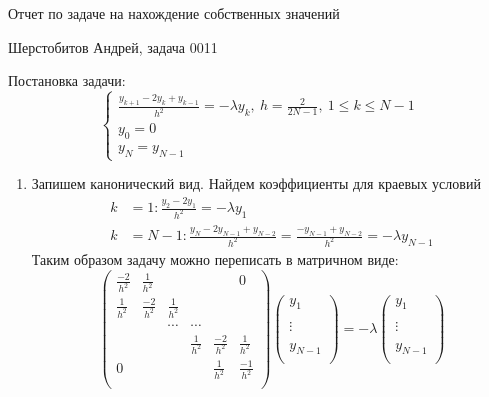 \documentclass[12pt]{article}
\begin{document}
\begin{center}
	Отчет по задаче на нахождение собственных значений
\end{center}
\begin{center}
	Шерстобитов Андрей, задача 0011
\end{center}
Постановка задачи:
\[\begin{cases}
		\frac{y_{k+1}-2y_k+y_{k-1}}{h^2} = -\lambda y_k,\ h = \frac{2}{2N-1},\ 1 \leq k \leq N-1 \\
		y_0 = 0                                                                                  \\
		y_N = y_{N-1}
	\end{cases}\]
\begin{enumerate}
	\item Запишем канонический вид. Найдем коэффициенты для краевых условий
	      \begin{align*}
		      k & = 1: \frac{y_2 - 2y_1}{h^2} = -\lambda y_1                                                    \\
		      k & = N-1: \frac{y_N - 2y_{N-1}+y_{N-2}}{h^2} = \frac{-y_{N-1} + y_{N-2}}{h^2} = -\lambda y_{N-1}
	      \end{align*}
	      Таким образом задачу можно переписать в матричном виде:
	      \[\left(\begin{array}{cccccc}
				      \frac{-2}{h^2} & \frac{1}{h^2}  &               &               &                & 0              \\
				      \frac{1}{h^2}  & \frac{-2}{h^2} & \frac{1}{h^2} &               &                &                \\
				                     &                & \cdots        & \cdots        &                &                \\
				                     &                &               & \frac{1}{h^2} & \frac{-2}{h^2} & \frac{1}{h^2}  \\
				      0              &                &               &               & \frac{1}{h^2}  & \frac{-1}{h^2} \\
			      \end{array}\right)
		      \left(\begin{array}{c}
				      y_{1}   \\
				      \\
				      \vdots  \\
				      \\
				      y_{N-1} \\
			      \end{array}\right)
		      =
		      -\lambda
		      \left(\begin{array}{c}
				      y_{1}   \\
				      \\
				      \vdots  \\
				      \\
				      y_{N-1} \\
			      \end{array}\right)
	      \]


\end{enumerate}
\end{document}
